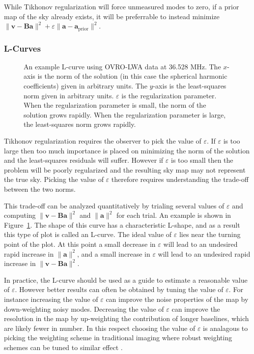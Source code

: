 \documentclass[twocolumn]{aastex61}
\renewcommand{\b}{\pmb}
\begin{document}
While Tikhonov regularization will force unmeasured modes to zero, if a prior map of the sky already
exists, it will be preferrable to instead minimize $\|\b v - \b B\b a\|^2 + \varepsilon \|\b a-\b
a_\text{prior}\|^2$.

\subsubsection{L-Curves}

\begin{figure}[t]
    \caption{
        An example L-curve using OVRO-LWA data at 36.528 MHz. The $x$-axis is the norm of the
        solution (in this case the spherical harmonic coefficients) given in arbitrary units. The
        $y$-axis is the least-squares norm given in arbitrary units. $\varepsilon$ is the
        regularization parameter. When the regularization parameter is small, the norm of the
        solution grows rapidly. When the regularization parameter is large, the least-squares norm
        grows rapidly.
    }
    \label{fig:lcurve}
\end{figure}

Tikhonov regularization requires the observer to pick the value of $\varepsilon$. If $\varepsilon$
is too large then too much importance is placed on minimizing the norm of the solution and the
least-squares residuals will suffer. However if $\varepsilon$ is too small then the problem will be
poorly regularized and the resulting sky map may not represent the true sky. Picking the value of
$\varepsilon$ therefore requires understanding the trade-off between the two norms.

This trade-off can be analyzed quantitatively by trialing several values of $\varepsilon$ and
computing $\|\b v - \b B\b a\|^2$ and $\|\b a\|^2$ for each trial. An example is shown in
Figure~\ref{fig:lcurve}. The shape of this curve has a characteristic L-shape, and as a result this
type of plot is called an L-curve. The ideal value of $\varepsilon$ lies near the turning point of
the plot. At this point a small decrease in $\varepsilon$ will lead to an undesired rapid increase
in $\|\b a\|^2$, and a small increase in $\varepsilon$ will lead to an undesired rapid increase in
$\|\b v - \b B\b a\|^2$.

In practice, the L-curve should be used as a guide to estimate a reasonable value of $\varepsilon$.
However better results can often be obtained by tuning the value of $\varepsilon$. For instance
increasing the value of $\varepsilon$ can improve the noise properties of the map by down-weighting
noisy modes. Decreasing the value of $\varepsilon$ can improve the resolution in the map by
up-weighting the contribution of longer baselines, which are likely fewer in number. In this respect
choosing the value of $\varepsilon$ is analagous to picking the weighting scheme in traditional
imaging where robust weighting schemes can be tuned to similar effect \citep{briggs}.
\end{document}
